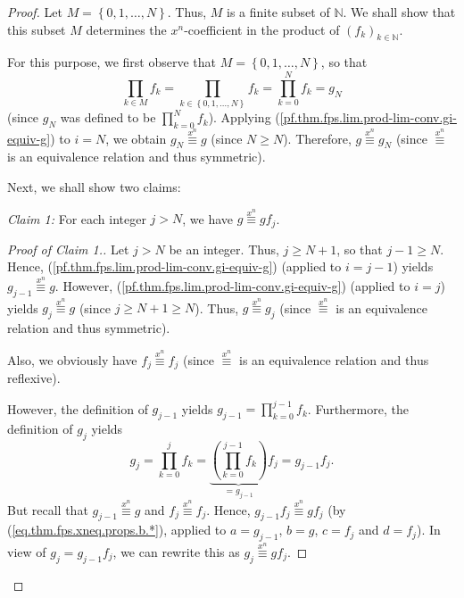 \begin{fineprint}
\begin{proof}
Let $M=\left\{  0,1,\ldots,N\right\}  $. Thus, $M$ is a finite subset of
$\mathbb{N}$. We shall show that this subset $M$ determines the $x^{n}%
$-coefficient in the product of $\left(  f_{k}\right)  _{k\in\mathbb{N}}$.

For this purpose, we first observe that $M=\left\{  0,1,\ldots,N\right\}  $,
so that%
\begin{equation}
\prod_{k\in M}f_{k}=\prod_{k\in\left\{  0,1,\ldots,N\right\}  }f_{k}%
=\prod_{k=0}^{N}f_{k}=g_{N} \label{pf.thm.fps.lim.prod-lim-conv.=gN}%
\end{equation}
(since $g_{N}$ was defined to be $\prod_{k=0}^{N}f_{k}$). Applying
(\ref{pf.thm.fps.lim.prod-lim-conv.gi-equiv-g}) to $i=N$, we obtain
$g_{N}\overset{x^{n}}{\equiv}g$ (since $N\geq N$). Therefore, $g\overset{x^{n}%
}{\equiv}g_{N}$ (since $\overset{x^{n}}{\equiv}$ is an equivalence relation
and thus symmetric).

Next, we shall show two claims:

\begin{statement}
\textit{Claim 1:} For each integer $j>N$, we have $g\overset{x^{n}}{\equiv
}gf_{j}$.
\end{statement}

\begin{proof}
[Proof of Claim 1.]Let $j>N$ be an integer. Thus, $j\geq N+1$, so that
$j-1\geq N$. Hence, (\ref{pf.thm.fps.lim.prod-lim-conv.gi-equiv-g}) (applied
to $i=j-1$) yields $g_{j-1}\overset{x^{n}}{\equiv}g$. However,
(\ref{pf.thm.fps.lim.prod-lim-conv.gi-equiv-g}) (applied to $i=j$) yields
$g_{j}\overset{x^{n}}{\equiv}g$ (since $j\geq N+1\geq N$). Thus,
$g\overset{x^{n}}{\equiv}g_{j}$ (since $\overset{x^{n}}{\equiv}$ is an
equivalence relation and thus symmetric).

Also, we obviously have $f_{j}\overset{x^{n}}{\equiv}f_{j}$ (since
$\overset{x^{n}}{\equiv}$ is an equivalence relation and thus reflexive).

However, the definition of $g_{j-1}$ yields $g_{j-1}=\prod_{k=0}^{j-1}f_{k}$.
Furthermore, the definition of $g_{j}$ yields%
\[
g_{j}=\prod_{k=0}^{j}f_{k}=\underbrace{\left(  \prod_{k=0}^{j-1}f_{k}\right)
}_{=g_{j-1}}f_{j}=g_{j-1}f_{j}.
\]
But recall that $g_{j-1}\overset{x^{n}}{\equiv}g$ and $f_{j}\overset{x^{n}%
}{\equiv}f_{j}$. Hence, $g_{j-1}f_{j}\overset{x^{n}}{\equiv}gf_{j}$ (by
(\ref{eq.thm.fps.xneq.props.b.*}), applied to $a=g_{j-1}$, $b=g$, $c=f_{j}$
and $d=f_{j}$). In view of $g_{j}=g_{j-1}f_{j}$, we can rewrite this as
$g_{j}\overset{x^{n}}{\equiv}gf_{j}$.


\end{proof}
\end{proof}
\end{fineprint}
